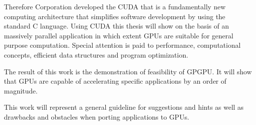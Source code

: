 Therefore {} Corporation developed the \gls{CUDA} that is a fundamentally new
computing architecture that simplifies software development by using the
standard C language. Using \gls{CUDA} this thesis will show on the basis of an
massively parallel application in which extent \glspl{GPU} are suitable for
general purpose computation. Special attention is paid to performance,
computational concepts, efficient data structures and program optimization.

The result of this work is the demonstration of feasibility of \gls{GPGPU}. It
will show that \glspl{GPU} are capable of accelerating specific applications by
an order of magnitude.

This work will represent a general guideline for suggestions and hints as 
well as drawbacks and obstacles when porting applications to \glspl{GPU}.


\vfill